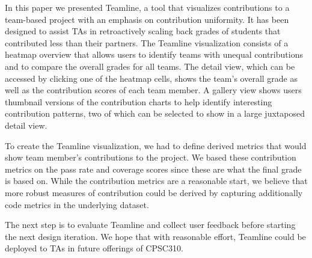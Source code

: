 \documentclass[../manifest.tex]{subfiles}
\begin{document}
In this paper we presented Teamline, a tool that visualizes contributions to a team-based project with an emphasis on contribution uniformity. It has been designed to assist TAs in retroactively scaling back grades of students that contributed less than their partners.  The Teamline visualization consists of a heatmap overview that allows users to identify teams with unequal contributions
and to compare the overall grades for all teams. The detail view, which can be accessed by clicking one of the heatmap cells, shows the team's overall grade as well as the contribution scores of each team member. A gallery view shows users thumbnail versions of the contribution charts to help identify interesting contribution patterns, two of which can be selected to show in a large juxtaposed detail view.

To create the Teamline visualization, we had to define derived metrics that would show team member's contributions to the project. We based these contribution metrics on the pass rate and coverage scores since these are what the final grade is based on. While the contribution metrics are a reasonable start, we believe that more robust measures of contribution could be derived by capturing additionally code metrics in the underlying dataset.

The next step is to evaluate Teamline and collect user feedback before starting the next design iteration. We hope that with reasonable effort, Teamline could be deployed to TAs in future offerings of CPSC310.
\end{document}
